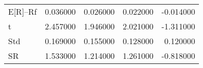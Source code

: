 \begin{tabular}{lrrrr}
\toprule
\midrule
E[R]--Rf & 0.036000 & 0.026000 & 0.022000 & -0.014000 \\
t & 2.457000 & 1.946000 & 2.021000 & -1.311000 \\
Std & 0.169000 & 0.155000 & 0.128000 & 0.120000 \\
SR & 1.533000 & 1.214000 & 1.261000 & -0.818000 \\
\bottomrule
\end{tabular}
